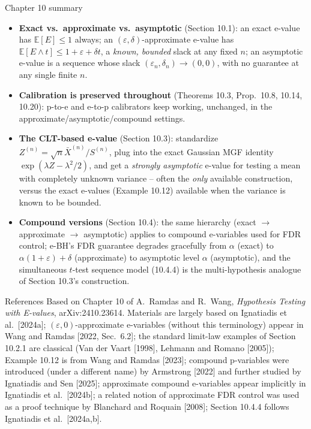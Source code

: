 \documentclass[aspectratio=169,10pt]{beamer}
\newcommand{\E}{\mathbb{E}}
\begin{document}
\begin{frame}{Chapter 10 summary}
  \begin{itemize}
    \item \textbf{Exact vs.\ approximate vs.\ asymptotic} (Section 10.1): an exact e-value has $\E[E]\leq1$ always; an $(\varepsilon,\delta)$-approximate e-value has $\E[E\wedge t]\leq1+\varepsilon+\delta t$, a \emph{known, bounded} slack at any fixed $n$; an asymptotic e-value is a sequence whose slack $(\varepsilon_n,\delta_n)\to(0,0)$, with no guarantee at any single finite $n$.
    \item \textbf{Calibration is preserved throughout} (Theorems 10.3, Prop.\ 10.8, 10.14, 10.20): p-to-e and e-to-p calibrators keep working, unchanged, in the approximate/asymptotic/compound settings.
    \item \textbf{The CLT-based e-value} (Section 10.3): standardize $Z^{(n)}=\sqrt n\bar X^{(n)}/S^{(n)}$, plug into the exact Gaussian MGF identity $\exp(\lambda Z-\lambda^2/2)$, and get a \emph{strongly asymptotic} e-value for testing a mean with completely unknown variance -- often the \emph{only} available construction, versus the exact e-values (Example 10.12) available when the variance is known to be bounded.
    \item \textbf{Compound versions} (Section 10.4): the same hierarchy (exact $\to$ approximate $\to$ asymptotic) applies to compound e-variables used for FDR control; e-BH's FDR guarantee degrades gracefully from $\alpha$ (exact) to $\alpha(1+\varepsilon)+\delta$ (approximate) to asymptotic level $\alpha$ (asymptotic), and the simultaneous $t$-test sequence model (10.4.4) is the multi-hypothesis analogue of Section 10.3's construction.
  \end{itemize}
\end{frame}

\begin{frame}{References}
  \small
  Based on Chapter 10 of A.\ Ramdas and R.\ Wang, \emph{Hypothesis Testing with E-values}, arXiv:2410.23614. Materials are largely based on Ignatiadis et al.\ [2024a]; $(\varepsilon,0)$-approximate e-variables (without this terminology) appear in Wang and Ramdas [2022, Sec.\ 6.2]; the standard limit-law examples of Section 10.2.1 are classical (Van der Vaart [1998], Lehmann and Romano [2005]); Example 10.12 is from Wang and Ramdas [2023]; compound p-variables were introduced (under a different name) by Armstrong [2022] and further studied by Ignatiadis and Sen [2025]; approximate compound e-variables appear implicitly in Ignatiadis et al.\ [2024b]; a related notion of approximate FDR control was used as a proof technique by Blanchard and Roquain [2008]; Section 10.4.4 follows Ignatiadis et al.\ [2024a,b].
\end{frame}
\end{document}
